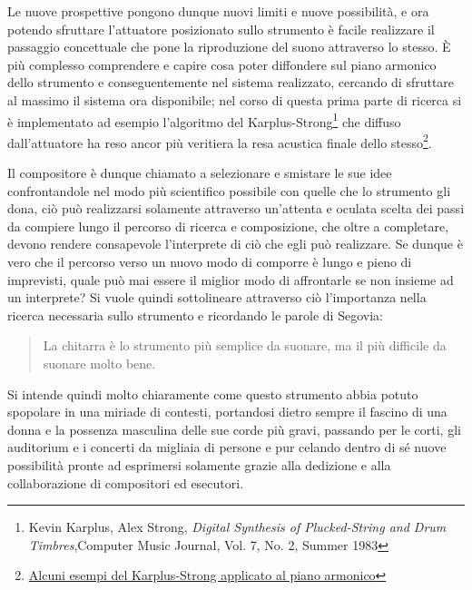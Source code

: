 \documentclass[oneside]{article}
\begin{document}
\begin{multicols*}{2}
Le nuove prospettive pongono dunque nuovi limiti e nuove possibilità, e ora potendo sfruttare l'attuatore posizionato sullo strumento è facile realizzare il passaggio concettuale che pone la riproduzione del suono attraverso lo stesso. È più complesso comprendere e capire cosa poter diffondere sul piano armonico dello strumento e conseguentemente nel sistema realizzato, cercando di sfruttare al massimo il sistema ora disponibile; nel corso di questa prima parte di ricerca si è implementato  ad esempio l'algoritmo del Karplus-Strong\footnote{Kevin Karplus, Alex Strong, \emph{Digital Synthesis of Plucked-String and Drum Timbres},Computer Music Journal, Vol. 7, No. 2, Summer 1983} che diffuso dall'attuatore ha reso ancor più veritiera la resa acustica finale dello stesso\footnote{\href{https://github.com/SMERM/BN-Tedesco/tree/master/COME-02/Lezioni_in_Compresenza/20200331/Esempi_Karplus-Strong_Attuatore_su_chitarra}{Alcuni esempi del Karplus-Strong applicato al piano armonico}}.

Il compositore è dunque chiamato a selezionare e smistare le sue idee confrontandole nel modo più scientifico possibile con quelle che lo strumento gli dona, ciò può realizzarsi  solamente attraverso un'attenta e oculata scelta dei passi da compiere lungo il percorso di ricerca e composizione, che oltre a completare, devono rendere consapevole l'interprete di ciò che egli può realizzare. Se dunque è vero che il percorso verso un nuovo modo di comporre è lungo e pieno di imprevisti, quale può mai essere il miglior modo di affrontarle se non insieme ad un interprete? Si vuole quindi sottolineare attraverso ciò l'importanza nella ricerca necessaria sullo strumento e ricordando le parole di Segovia: \begin{quote} La chitarra è lo strumento più semplice da suonare, ma il più difficile da suonare molto bene.\end{quote} Si intende quindi molto chiaramente come questo strumento abbia potuto spopolare in una miriade di contesti, portandosi dietro sempre il fascino di una donna e la possenza masculina delle sue corde più gravi, passando per le corti, gli auditorium e i concerti da migliaia di persone e pur celando dentro di sé nuove possibilità pronte ad esprimersi solamente grazie alla dedizione e alla collaborazione di compositori ed esecutori. 


\newpage



\end{multicols*}
\end{document}
